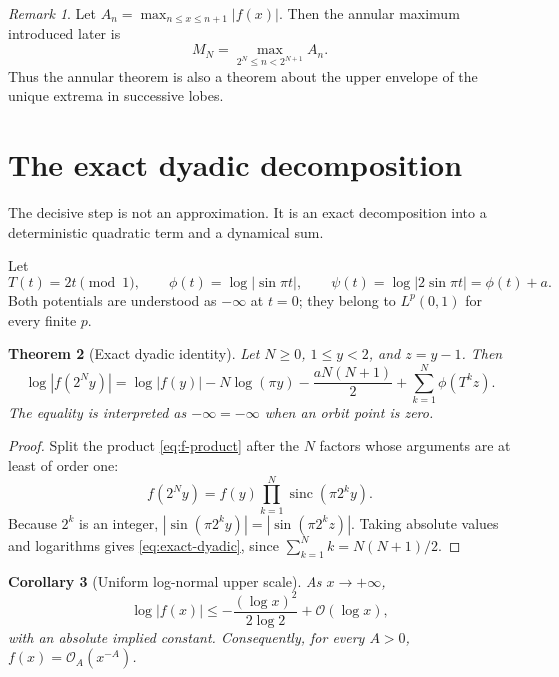 \documentclass[11pt,oneside]{article}
\newtheorem{theorem}{Theorem}[section]
\newtheorem{corollary}[theorem]{Corollary}
\theoremstyle{definition}
\theoremstyle{remark}
\newtheorem{remark}[theorem]{Remark}
\newcommand{\sinc}{\operatorname{sinc}}
\newcommand{\bigO}{\mathcal O}
\newcommand{\T}{T}
\begin{document}
\begin{remark}
Let $A_n=\max_{n\le x\le n+1}|f(x)|$.  Then the annular maximum introduced
later is
\[
 M_N=\max_{2^N\le n<2^{N+1}}A_n.
\]
Thus the annular theorem is also a theorem about the upper envelope of the
unique extrema in successive lobes.
\end{remark}

\section{The exact dyadic decomposition}

The decisive step is not an approximation.  It is an exact decomposition into
a deterministic quadratic term and a dynamical sum.

Let
\begin{equation}
 \T(t)=2t\pmod1,
 \qquad
 \phi(t)=\log|\sin\pi t|,
 \qquad
 \psi(t)=\log|2\sin\pi t|=\phi(t)+a.                       \label{eq:potentials}
\end{equation}
Both potentials are understood as $-\infty$ at $t=0$; they belong to $L^p(0,1)$
for every finite $p$.

\begin{theorem}[Exact dyadic identity]
Let $N\ge0$, $1\le y<2$, and $z=y-1$.  Then
\begin{equation}
 \boxed{\quad
 \log|f(2^Ny)|
 =\log|f(y)|-N\log(\pi y)-\frac{aN(N+1)}2
  +\sum_{k=1}^{N}\phi(\T^kz).
 \quad}                                                     \label{eq:exact-dyadic}
\end{equation}
The equality is interpreted as $-\infty=-\infty$ when an orbit point is zero.
\end{theorem}

\begin{proof}
Split the product \eqref{eq:f-product} after the $N$ factors whose arguments
are at least of order one:
\[
 f(2^Ny)=f(y)\prod_{k=1}^{N}\sinc(\pi2^ky).
\]
Because $2^k$ is an integer,
$|\sin(\pi2^ky)|=|\sin(\pi2^kz)|$.  Taking absolute values and logarithms gives
\eqref{eq:exact-dyadic}, since $\sum_{k=1}^{N}k=N(N+1)/2$.
\end{proof}

\begin{corollary}[Uniform log-normal upper scale]
As $x\to+\infty$,
\begin{equation}
 \log|f(x)|\le-\frac{(\log x)^2}{2\log2}+\bigO(\log x),     \label{eq:universal-upper}
\end{equation}
with an absolute implied constant.  Consequently, for every $A>0$,
$f(x)=\bigO_A(x^{-A})$.
\end{corollary}
\end{document}
